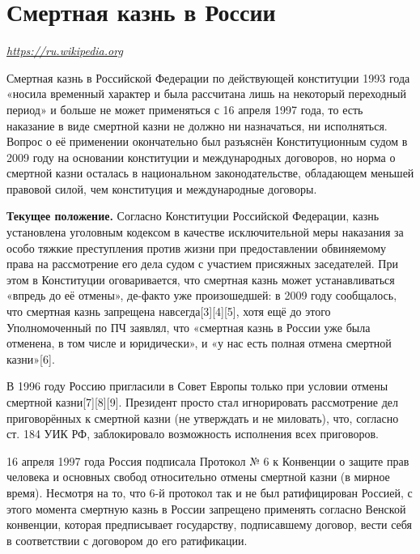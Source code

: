 
\section{Смертная казнь в России}

 {\it \url{https://ru.wikipedia.org}}

Смертная казнь в Российской Федерации по действующей конституции 1993 года «носила временный характер и была рассчитана лишь на некоторый переходный период» и больше не может применяться с 16 апреля 1997 года, то есть наказание в виде смертной казни не должно ни назначаться, ни исполняться. Вопрос о её применении окончательно был разъяснён Конституционным судом в 2009 году на основании конституции и международных договоров, но норма о смертной казни осталась в национальном законодательстве, обладающем меньшей правовой силой, чем конституция и международные договоры.

\textbf{Текущее положение.} Согласно Конституции Российской Федерации, казнь установлена уголовным кодексом в качестве исключительной меры наказания за особо тяжкие преступления против жизни при предоставлении обвиняемому права на рассмотрение его дела судом с участием присяжных заседателей. При этом в Конституции оговаривается, что смертная казнь может устанавливаться «впредь до её отмены», де-факто уже произошедшей: в 2009 году сообщалось, что смертная казнь запрещена навсегда[3][4][5], хотя ещё до этого Уполномоченный по ПЧ заявлял, что «смертная казнь в России уже была отменена, в том числе и юридически», и «у нас есть полная отмена смертной казни»[6].

В 1996 году Россию пригласили в Совет Европы только при условии отмены смертной казни[7][8][9]. Президент просто стал игнорировать рассмотрение дел приговорённых к смертной казни (не утверждать и не миловать), что, согласно ст. 184 УИК РФ, заблокировало возможность исполнения всех приговоров.

16 апреля 1997 года Россия подписала Протокол № 6 к Конвенции о защите прав человека и основных свобод относительно отмены смертной казни (в мирное время). Несмотря на то, что 6-й протокол так и не был ратифицирован Россией, с этого момента смертную казнь в России запрещено применять согласно Венской конвенции, которая предписывает государству, подписавшему договор, вести себя в соответствии с договором до его ратификации.


